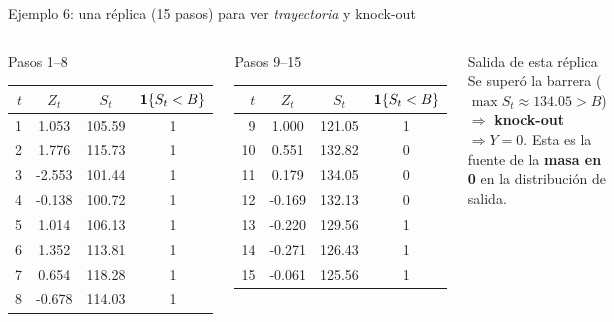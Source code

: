 \documentclass[aspectratio=1610, 9pt]{beamer}
\begin{document}
\begin{frame}{Ejemplo 6: una réplica (15 pasos) para ver \emph{trayectoria} y knock-out}
\scriptsize
\begin{columns}[T]
\begin{block}{Pasos 1--8}
\centering
\setlength{\tabcolsep}{4pt}
\begin{tabular}{@{}rccc@{}}
\toprule
$t$ & $Z_t$ & $S_t$ & $\mathbf{1}\{S_t<B\}$ \\
\midrule
1 & 1.053 & 105.59 & 1 \\
2 & 1.776 & 115.73 & 1 \\
3 & -2.553 & 101.44 & 1 \\
4 & -0.138 & 100.72 & 1 \\
5 & 1.014 & 106.13 & 1 \\
6 & 1.352 & 113.81 & 1 \\
7 & 0.654 & 118.28 & 1 \\
8 & -0.678 & 114.03 & 1 \\
\bottomrule
\end{tabular}
\end{block}

\begin{block}{Pasos 9--15}
\centering
\setlength{\tabcolsep}{4pt}
\begin{tabular}{@{}rccc@{}}
\toprule
$t$ & $Z_t$ & $S_t$ & $\mathbf{1}\{S_t<B\}$ \\
\midrule
9 & 1.000 & 121.05 & 1 \\
10 & 0.551 & 132.82 & 0 \\
11 & 0.179 & 134.05 & 0 \\
12 & -0.169 & 132.13 & 0 \\
13 & -0.220 & 129.56 & 1 \\
14 & -0.271 & 126.43 & 1 \\
15 & -0.061 & 125.56 & 1 \\
\bottomrule
\end{tabular}
\end{block}

\begin{alertblock}{Salida de esta réplica}
Se superó la barrera ($\max S_t\approx 134.05>B$) $\Rightarrow$ \textbf{knock-out} $\Rightarrow Y=0$.
Esta es la fuente de la \textbf{masa en 0} en la distribución de salida.
\end{alertblock}
\end{columns}
\end{frame}
\end{document}
